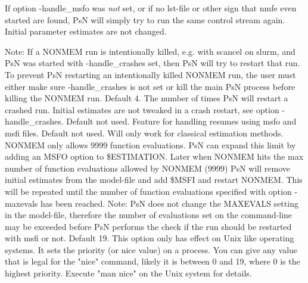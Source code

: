 \begin{optionlist}
If option -handle\_msfo was \emph{not} set, or if no lst-file or other sign that nmfe even started are found,
PsN will simply try to run the same control stream again. Initial parameter estimates are not changed.  

Note: If a NONMEM run is intentionally killed, e.g. with scancel on slurm, and PsN was started
with -handle\_crashes set, then PsN will try to restart that run. To prevent PsN restarting
an intentionally killed NONMEM run, the user must either make sure -handle\_crashes is not set
or kill the main PsN process before killing the NONMEM run.
\nextopt
{}
Default 4. The number of times PsN will restart a crashed run. Initial estimates are not tweaked in a crash restart, see option
-handle\_crashes.
\nextopt
{}
Default not used. Feature for handling resumes using msfo and msfi files. 
\nextopt
{}
Default not used. Will only work for classical estimation methods. NONMEM only allows 9999 function evaluations. PsN can expand this limit by adding an MSFO option to \$ESTIMATION. Later when NONMEM hits the max number of function evaluations allowed by NONMEM (9999) PsN will remove initial estimates from the model-file and add \$MSFI and restart NONMEM. This will be repeated until the number of function evaluations specified with option -maxevals has been reached. Note: PsN does not change the MAXEVALS setting in the model-file, therefore the number of evaluations set on the command-line may be exceeded before PsN performs the check if the run should be restarted with msfi or not. 
\nextopt
{}
Default 19. This option only has effect on Unix like operating systems. It  sets the priority (or nice value) on a process. You can give any value that is legal for the "nice" command, likely it is between 0 and 19, where 0 is the highest priority. Execute "man nice" on the Unix system for details. 
\nextopt
\end{optionlist}
